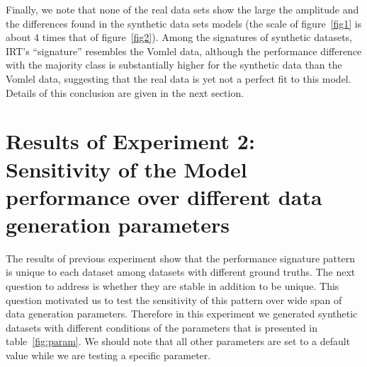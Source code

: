 
Finally, we note that none of the real data sets show the large the amplitude and the differences found in the synthetic data sets models (the scale of figure~\ref{fig1} is about 4 times that of figure~\ref{fig2}). Among the signatures of synthetic datasets, IRT's  ``signature'' resembles the Vomlel data, although the performance difference with the majority class is substantially higher for the synthetic data than the Vomlel data, suggesting that the real data is yet not a perfect fit to this model. Details of this conclusion are given in the next section.

\section{Results of Experiment 2: Sensitivity of the Model performance over different data generation parameters}
\label{Sensitive}

The results of previous experiment show that the performance signature pattern is unique to each dataset among datasets with different ground truths. The next question to address is whether they are stable in addition to be unique.  This question motivated us to test the sensitivity of this pattern over wide span of data generation parameters. Therefore in this experiment we generated synthetic datasets with different conditions of the parameters that is presented in table~\ref{fig:param}. We should note that all other parameters are set to a default value while we are testing a specific parameter.

